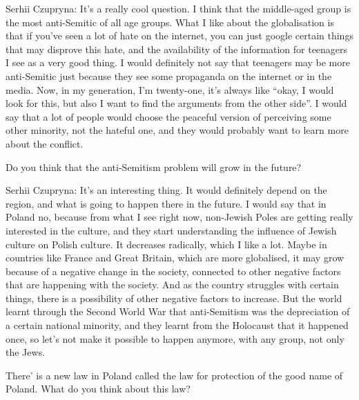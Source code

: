 Serhii Czupryna: It’s a really cool question. I think that the middle-aged group is the most anti-Semitic of all age groups. What I like about the globalisation is that if you’ve seen a lot of hate on the internet, you can just google certain things that may disprove this hate, and the availability of the information for teenagers I see as a very good thing. I would definitely not say that teenagers may be more anti-Semitic just because they see some propaganda on the internet or in the media. Now, in my generation, I’m twenty-one, it’s always like “okay, I would look for this, but also I want to find the arguments from the other side”. I would say that a lot of people would choose the peaceful version of perceiving some other minority, not the hateful one, and they would probably want to learn more about the conflict. 

Do you think that the anti-Semitism problem will grow in the future? 

Serhii Czupryna: It’s an interesting thing. It would definitely depend on the region, and what is going to happen there in the future. I would say that in Poland no, because from what I see right now, non-Jewish Poles are getting really interested in the culture, and they start understanding the influence of Jewish culture on Polish culture. It decreases radically, which I like a lot. Maybe in countries like France and Great Britain, which are more globalised, it may grow because of a negative change in the society, connected to other negative factors that are happening with the society. And as the country struggles with certain things, there is a possibility of other negative factors to increase. But the world learnt through the Second World War that anti-Semitism was the depreciation of a certain national minority, and they learnt from the Holocaust that it happened once, so let’s not make it possible to happen anymore, with any group, not only the Jews.  

There’ is a new law in Poland called the law for protection of the good name of Poland. What do you think about this law? 

